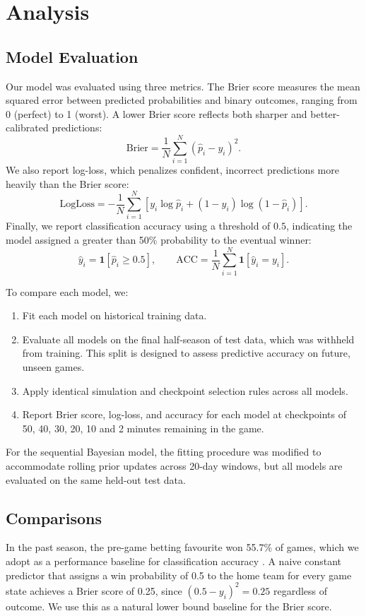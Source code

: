 \documentclass{article}
\begin{document}
\section{Analysis}

\subsection{Model Evaluation}
Our model was evaluated using three metrics. The Brier score measures the mean squared error
between predicted probabilities and binary outcomes, ranging from 0 (perfect) to 1 (worst).
A lower Brier score reflects both sharper and better-calibrated predictions:
\[
\mathrm{Brier}
=
\frac{1}{N}\sum_{i=1}^N(\hat p_i-y_i)^2.
\]
We also report log-loss, which penalizes confident, incorrect predictions more heavily than
the Brier score:
\[
\mathrm{LogLoss}
=
-\frac{1}{N}\sum_{i=1}^N
\left[
y_i\log \hat p_i + (1-y_i)\log(1-\hat p_i)
\right].
\]
Finally, we report classification accuracy using a threshold of $0.5$, indicating the model
assigned a greater than 50\% probability to the eventual winner:
\[
\hat y_i = \mathbf{1}[\hat p_i \ge 0.5],\qquad
\mathrm{ACC}
=
\frac{1}{N}\sum_{i=1}^N \mathbf{1}[\hat y_i = y_i].
\]

To compare each model, we:
\begin{enumerate}
\item Fit each model on historical training data.
\item Evaluate all models on the final half-season of test data, which was withheld from training. This split is designed to assess predictive accuracy on future, unseen games.
\item Apply identical simulation and checkpoint selection rules across all models.
\item Report Brier score, log-loss, and accuracy for each model at checkpoints of 50, 40, 30, 20, 10 and 2 minutes remaining in the game.
\end{enumerate}
For the sequential Bayesian model, the fitting procedure was modified to accommodate rolling
prior updates across 20-day windows, but all models are evaluated on the same held-out
test data.

\subsection{Comparisons}
In the past season, the pre-game betting favourite won 55.7\% of games, which we adopt as a
performance baseline for classification accuracy \citep{covers-nhl-trends}. A naive constant predictor that assigns a
win probability of 0.5 to the home team for every game state achieves a Brier score of 0.25,
since $(0.5 - y_i)^2 = 0.25$ regardless of outcome. We use this as a natural lower bound
baseline for the Brier score.
\end{document}
